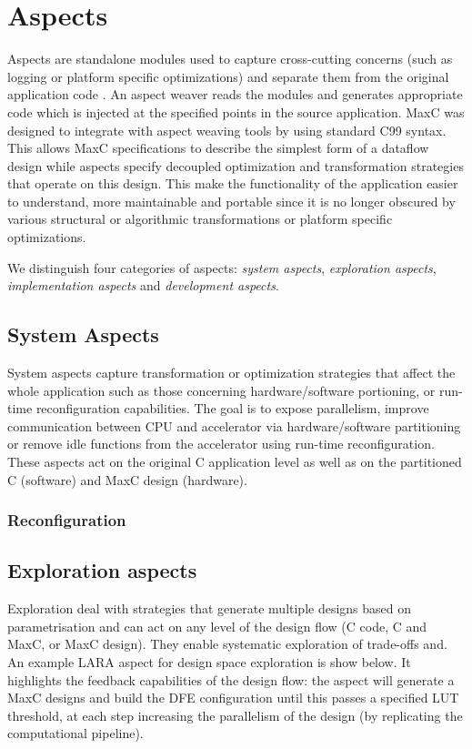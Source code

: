 \section{Aspects}

Aspects are standalone modules used to capture cross-cutting concerns
(such as logging or platform specific optimizations) and separate them
from the original application code \cite{Kiczales:2001}. An aspect
weaver reads the modules and generates appropriate code which is
injected at the specified points in the source application. MaxC was
designed to integrate with aspect weaving tools by using standard C99
syntax. This allows MaxC specifications to describe the simplest form
of a dataflow design while aspects specify decoupled optimization and
transformation strategies that operate on this design. This make the
functionality of the application easier to understand, more
maintainable and portable since it is no longer obscured by various
structural or algorithmic transformations or platform specific
optimizations.

We distinguish four categories of aspects: \emph{system aspects},
\emph{exploration aspects}, \emph{implementation aspects} and
\emph{development aspects}.


\subsection{System Aspects}

System aspects capture transformation or optimization strategies that
affect the whole application such as those concerning
hardware/software portioning, or run-time reconfiguration
capabilities. The goal is to expose parallelism, improve communication
between CPU and accelerator via hardware/software partitioning or
remove idle functions from the accelerator using run-time
reconfiguration. These aspects act on the original C application level
as well as on the partitioned C (software) and MaxC design (hardware).


\subsubsection{\TODO Reconfiguration}

\subsection{Exploration aspects}

Exploration deal with strategies that generate multiple designs based
on parametrisation and can act on any level of the design flow (C
code, C and MaxC, or MaxC design). They enable systematic exploration
of trade-offs and. An example LARA aspect for design space exploration
is show below. It highlights the feedback capabilities of the design
flow: the aspect will generate a MaxC designs and build the DFE
configuration until this passes a specified LUT threshold, at each
step increasing the parallelism of the design (by replicating the
computational pipeline).

